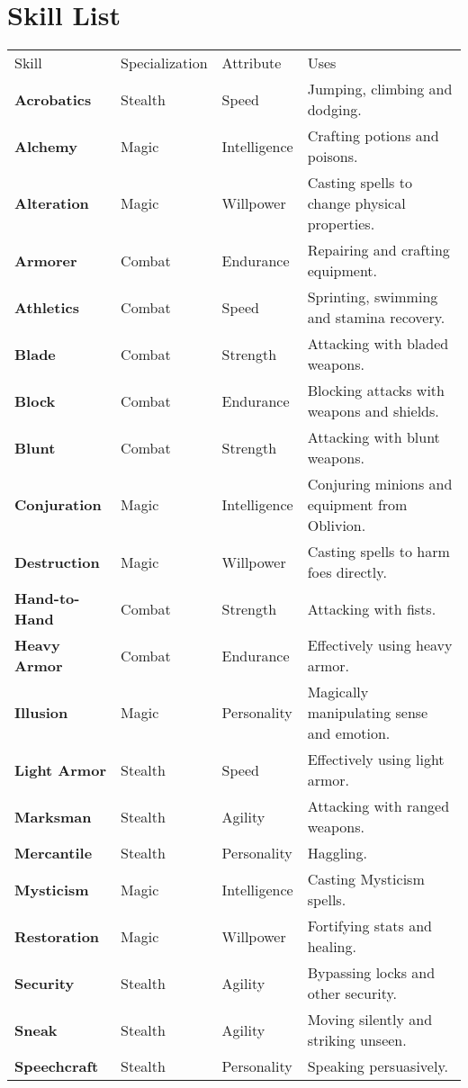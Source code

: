 \section{Skill List}
{
\begin{longtable}[h]{llll}
	\rowcolor{gray!50}
	Skill & Specialization & Attribute & Uses\\
	\textbf{Acrobatics} & Stealth & Speed & Jumping, climbing and dodging.\\
	\textbf{Alchemy} & Magic & Intelligence & Crafting potions and poisons.\\
	\textbf{Alteration} & Magic & Willpower & Casting spells to change physical properties.\\
	\textbf{Armorer} & Combat & Endurance & Repairing and crafting equipment.\\
	\textbf{Athletics} & Combat & Speed & Sprinting, swimming and stamina recovery.\\
	\textbf{Blade} & Combat & Strength & Attacking with bladed weapons.\\
	\textbf{Block} & Combat & Endurance & Blocking attacks with weapons and shields.\\
	\textbf{Blunt} & Combat & Strength & Attacking with blunt weapons.\\
	\textbf{Conjuration} & Magic & Intelligence & Conjuring minions and equipment from Oblivion.\\
	\textbf{Destruction} & Magic & Willpower & Casting spells to harm foes directly.\\
	\textbf{Hand-to-Hand} & Combat & Strength & Attacking with fists.\\
	\textbf{Heavy Armor} & Combat & Endurance & Effectively using heavy armor.\\
	\textbf{Illusion} & Magic & Personality & Magically manipulating sense and emotion.\\
	\textbf{Light Armor} & Stealth & Speed & Effectively using light armor.\\
	\textbf{Marksman} & Stealth & Agility & Attacking with ranged weapons.\\
	\textbf{Mercantile} & Stealth & Personality & Haggling.\\
	\textbf{Mysticism} & Magic & Intelligence & Casting Mysticism spells.\\
	\textbf{Restoration} & Magic & Willpower & Fortifying stats and healing.\\
	\textbf{Security} & Stealth & Agility & Bypassing locks and other security.\\
	\textbf{Sneak} & Stealth & Agility & Moving silently and striking unseen.\\
	\textbf{Speechcraft} & Stealth & Personality & Speaking persuasively.\\
\end{longtable}
}

